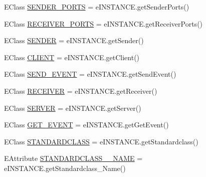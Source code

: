 \begin{DoxyCompactItemize}
\item 
E\-Class \hyperlink{interfaceshootingmachineemfmodel_1_1_shootingmachineemfmodel_package_1_1_literals_a27631e3b6ae881f7793efd141acfd678}{S\-E\-N\-D\-E\-R\-\_\-\-P\-O\-R\-T\-S} = e\-I\-N\-S\-T\-A\-N\-C\-E.\-get\-Sender\-Ports()
\item 
E\-Class \hyperlink{interfaceshootingmachineemfmodel_1_1_shootingmachineemfmodel_package_1_1_literals_a8a2c5b058053298e29f461c04c2f077e}{R\-E\-C\-E\-I\-V\-E\-R\-\_\-\-P\-O\-R\-T\-S} = e\-I\-N\-S\-T\-A\-N\-C\-E.\-get\-Receiver\-Ports()
\item 
E\-Class \hyperlink{interfaceshootingmachineemfmodel_1_1_shootingmachineemfmodel_package_1_1_literals_aa357d1c04e9e4b8441204c409714c446}{S\-E\-N\-D\-E\-R} = e\-I\-N\-S\-T\-A\-N\-C\-E.\-get\-Sender()
\item 
E\-Class \hyperlink{interfaceshootingmachineemfmodel_1_1_shootingmachineemfmodel_package_1_1_literals_a94f1cf9078e7f24c78b992d0e1212708}{C\-L\-I\-E\-N\-T} = e\-I\-N\-S\-T\-A\-N\-C\-E.\-get\-Client()
\item 
E\-Class \hyperlink{interfaceshootingmachineemfmodel_1_1_shootingmachineemfmodel_package_1_1_literals_a317aabab1ec23d18b8de6dd458f47caa}{S\-E\-N\-D\-\_\-\-E\-V\-E\-N\-T} = e\-I\-N\-S\-T\-A\-N\-C\-E.\-get\-Send\-Event()
\item 
E\-Class \hyperlink{interfaceshootingmachineemfmodel_1_1_shootingmachineemfmodel_package_1_1_literals_a50715f2844adcd5662cb7927a77a688a}{R\-E\-C\-E\-I\-V\-E\-R} = e\-I\-N\-S\-T\-A\-N\-C\-E.\-get\-Receiver()
\item 
E\-Class \hyperlink{interfaceshootingmachineemfmodel_1_1_shootingmachineemfmodel_package_1_1_literals_a1036dfbc9612abd79064026db37b0a33}{S\-E\-R\-V\-E\-R} = e\-I\-N\-S\-T\-A\-N\-C\-E.\-get\-Server()
\item 
E\-Class \hyperlink{interfaceshootingmachineemfmodel_1_1_shootingmachineemfmodel_package_1_1_literals_a33cdd3a6ccbe45b441e89418a368043f}{G\-E\-T\-\_\-\-E\-V\-E\-N\-T} = e\-I\-N\-S\-T\-A\-N\-C\-E.\-get\-Get\-Event()
\item 
E\-Class \hyperlink{interfaceshootingmachineemfmodel_1_1_shootingmachineemfmodel_package_1_1_literals_a11dc8cd59d7a5eb2014c42a630a5146e}{S\-T\-A\-N\-D\-A\-R\-D\-C\-L\-A\-S\-S} = e\-I\-N\-S\-T\-A\-N\-C\-E.\-get\-Standardclass()
\item 
E\-Attribute \hyperlink{interfaceshootingmachineemfmodel_1_1_shootingmachineemfmodel_package_1_1_literals_aa9fb7c83a73b8783944eaf8463d2626f}{S\-T\-A\-N\-D\-A\-R\-D\-C\-L\-A\-S\-S\-\_\-\-\_\-\-N\-A\-M\-E} = e\-I\-N\-S\-T\-A\-N\-C\-E.\-get\-Standardclass\-\_\-\-Name()

\end{DoxyCompactItemize}
